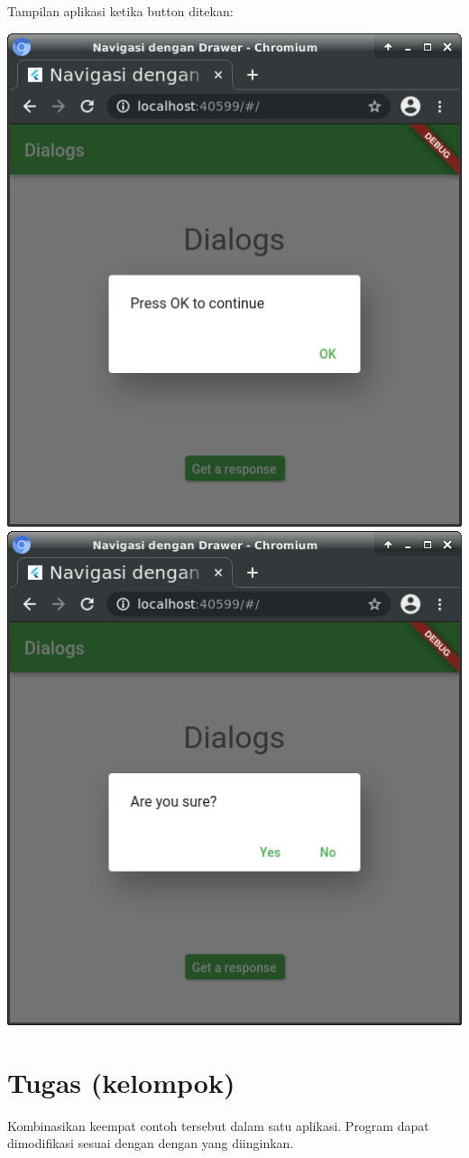 \documentclass[a4paper,11pt]{article} %
\begin{document}
Tampilan aplikasi ketika button ditekan:
{\center
\includegraphics[scale=0.5]{images/navigation_dialog_2.png}%
\includegraphics[scale=0.5]{images/navigation_dialog_3.png}
\par}


\section{Tugas (kelompok)}

Kombinasikan keempat contoh tersebut dalam satu aplikasi.
Program dapat dimodifikasi sesuai dengan dengan yang diinginkan.



\end{document}
